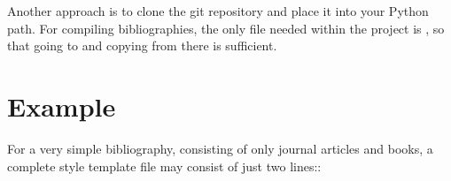 \documentclass[letterpaper,10pt,english]{sphinxmanual}
\begin{document}
Another approach is to clone the git repository  and place it into your Python path.
For compiling bibliographies, the only file needed within the project is , so that going to  and copying  from there is sufficient.


\section{Example}
\label{\detokenize{index:example}}
For a very simple bibliography, consisting of only journal articles and books, a complete style template file may consist of just two lines::

%
\begin{sphinxVerbatim}[commandchars=\\\{\}]
   \PYGZbs{} \PYGZbs{} \PYGZbs{} 
             \PYG{p}{[}\PYG{p}{]} \PYG{p}{[} \PYG{p}{]}
  \PYG{p}{[}\PYG{p}{]} \PYGZbs{}  
             \PYG{p}{[} \PYG{p}{]}\PYG{p}{[} \PYG{p}{]}
\end{sphinxVerbatim}
\end{document}
